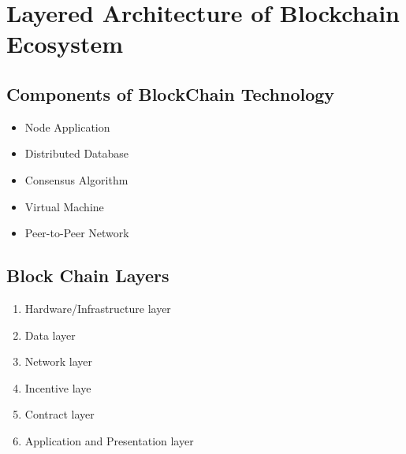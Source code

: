\documentclass[6pt,a4paper]{report}
\begin{document}
	\chapter{Layered Architecture of Blockchain Ecosystem}
	\begin{small}
		\section{Components of BlockChain Technology}
		\begin{itemize}
			\item Node Application
			\item Distributed Database
			\item Consensus Algorithm
			\item Virtual Machine
			\item Peer-to-Peer Network
		\end{itemize}
	\section{Block Chain Layers}
\begin{enumerate}
\item Hardware/Infrastructure layer
\item Data layer
\item Network layer
\item Incentive laye
\item Contract layer
\item Application and Presentation layer
\end{enumerate}
\end{small}
\end{document}
